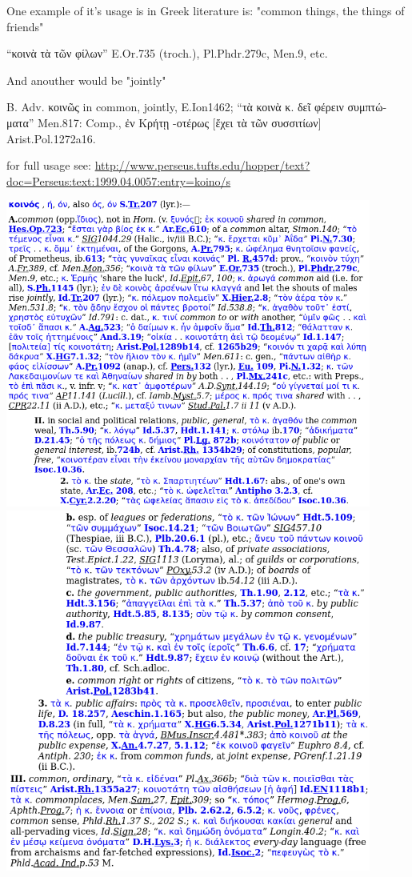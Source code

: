 \documentclass[11pt]{article}
\begin{document}
\begin{thebibliography}{37}
One example of it's usage is in Greek literature is:
"common things, the things of friends"
\begin{greek}
“κοινὰ τὰ τῶν φίλων” E.Or.735 (troch.), Pl.Phdr.279c, Men.9, etc.

And anouther would be "jointly"

B. Adv. κοινῶς in common, jointly, E.Ion1462; “τὰ κοινὰ κ. δεῖ φέρειν συμπτώματα” Men.817: Comp., ἐν Κρήτῃ -οτέρως [ἔχει τὰ τῶν συσσιτίων] Arist.Pol.1272a16.

for full usage see:
\url{http://www.perseus.tufts.edu/hopper/text?doc=Perseus:text:1999.04.0057:entry=koino/s}
\end{greek}

\includegraphics[width=12cm]{koinos1}
\includegraphics[width=12cm]{koinos2}

\end{thebibliography}
\end{document}
